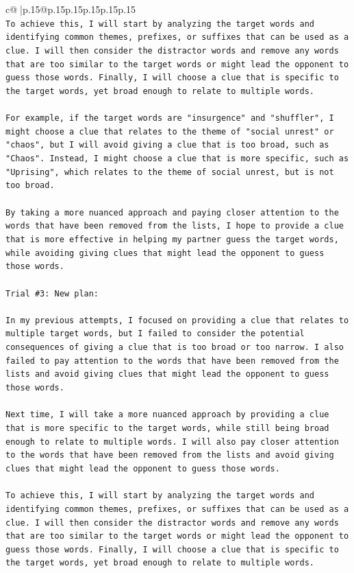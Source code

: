 \documentclass{article}
\begin{document}
{\begin{supertabular}{c@{$\;$}|p{.15\linewidth}@{}p{.15\linewidth}p{.15\linewidth}p{.15\linewidth}p{.15\linewidth}p{.15\linewidth}}
{{{\\ 
\texttt{To achieve this, I will start by analyzing the target words and identifying common themes, prefixes, or suffixes that can be used as a clue. I will then consider the distractor words and remove any words that are too similar to the target words or might lead the opponent to guess those words. Finally, I will choose a clue that is specific to the target words, yet broad enough to relate to multiple words.} \\
\\ 
\texttt{For example, if the target words are "insurgence" and "shuffler", I might choose a clue that relates to the theme of "social unrest" or "chaos", but I will avoid giving a clue that is too broad, such as "Chaos". Instead, I might choose a clue that is more specific, such as "Uprising", which relates to the theme of social unrest, but is not too broad.} \\
\\ 
\texttt{By taking a more nuanced approach and paying closer attention to the words that have been removed from the lists, I hope to provide a clue that is more effective in helping my partner guess the target words, while avoiding giving clues that might lead the opponent to guess those words.} \\
\\ 
\texttt{Trial \#3: New plan: } \\
\\ 
\texttt{In my previous attempts, I focused on providing a clue that relates to multiple target words, but I failed to consider the potential consequences of giving a clue that is too broad or too narrow. I also failed to pay attention to the words that have been removed from the lists and avoid giving clues that might lead the opponent to guess those words.} \\
\\ 
\texttt{Next time, I will take a more nuanced approach by providing a clue that is more specific to the target words, while still being broad enough to relate to multiple words. I will also pay closer attention to the words that have been removed from the lists and avoid giving clues that might lead the opponent to guess those words.} \\
\\ 
\texttt{To achieve this, I will start by analyzing the target words and identifying common themes, prefixes, or suffixes that can be used as a clue. I will then consider the distractor words and remove any words that are too similar to the target words or might lead the opponent to guess those words. Finally, I will choose a clue that is specific to the target words, yet broad enough to relate to multiple words.} \\
}}}
\end{supertabular}}
\end{document}
